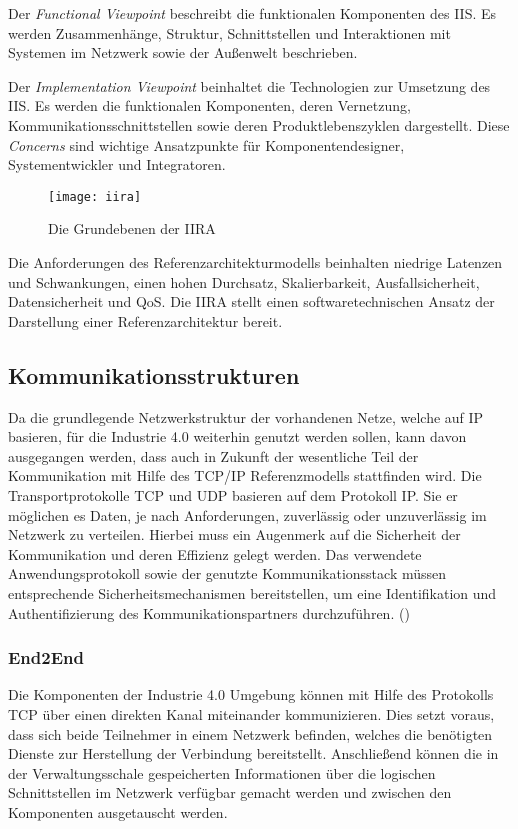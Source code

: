 Der \textit{Functional Viewpoint} beschreibt die funktionalen Komponenten des \ac{IIS}. Es werden Zusammenhänge, Struktur, Schnittstellen und Interaktionen mit Systemen im Netzwerk sowie der Außenwelt beschrieben.

Der \textit{Implementation Viewpoint} beinhaltet die Technologien zur Umsetzung des \ac{IIS}. Es werden die funktionalen Komponenten, deren Vernetzung, Kommunikationsschnittstellen sowie deren Produktlebenszyklen dargestellt. Diese \textit{Concerns} sind wichtige Ansatzpunkte für Komponentendesigner, Systementwickler und Integratoren. 

\begin{figure}[h]
  \centering
  \texttt{[image: iira]}
  \caption{Die Grundebenen der IIRA} 
  \label{Grundlagen:IIAF/IIRA - Übersicht}
\end{figure}

Die Anforderungen des Referenzarchitekturmodells beinhalten niedrige Latenzen und Schwankungen, einen hohen Durchsatz, Skalierbarkeit, Ausfallsicherheit, Datensicherheit und \ac{QoS}. Die \ac{IIRA} stellt einen softwaretechnischen Ansatz der Darstellung einer Referenzarchitektur bereit.

\subsection{Kommunikationsstrukturen}
\label{Grundlagen:Kommunikationsstrukturen}
Da die grundlegende Netzwerkstruktur der vorhandenen Netze, welche auf \ac{IP} basieren, für die Industrie 4.0 weiterhin genutzt werden sollen, kann davon ausgegangen werden, dass auch in Zukunft der wesentliche Teil der Kommunikation mit Hilfe des \ac{TCP}/\ac{IP} Referenzmodells stattfinden wird. Die Transportprotokolle \ac{TCP} und \ac{UDP} basieren auf dem Protokoll \ac{IP}. Sie er möglichen es Daten, je nach Anforderungen, zuverlässig oder unzuverlässig im Netzwerk zu verteilen. Hierbei muss ein Augenmerk auf die Sicherheit der Kommunikation und deren Effizienz gelegt werden. Das verwendete Anwendungsprotokoll sowie der genutzte Kommunikationsstack müssen entsprechende Sicherheitsmechanismen bereitstellen, um eine Identifikation und Authentifizierung des Kommunikationspartners durchzuführen. (\cite{sichKom2017})

\subsubsection{End2End}
\label{Grundlagen:End2End}
Die Komponenten der Industrie 4.0 Umgebung können mit Hilfe des Protokolls \ac{TCP} über einen direkten Kanal miteinander kommunizieren. Dies setzt voraus, dass sich beide Teilnehmer in einem Netzwerk befinden, welches die benötigten Dienste zur Herstellung der Verbindung bereitstellt. Anschließend können die in der Verwaltungsschale gespeicherten Informationen über die logischen Schnittstellen im Netzwerk verfügbar gemacht werden und zwischen den Komponenten ausgetauscht werden.

